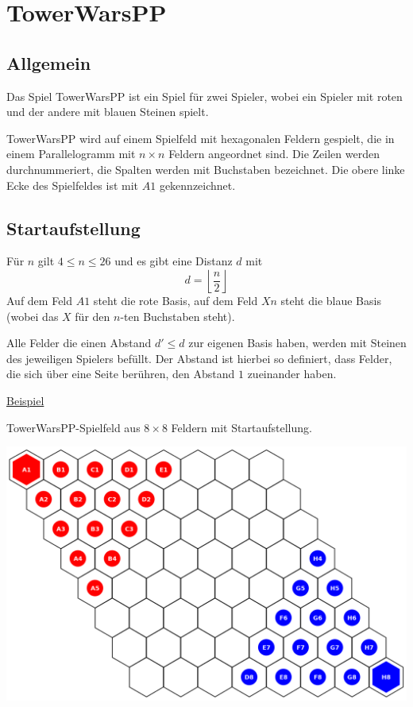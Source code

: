 \section*{TowerWarsPP}
\newcommand{\myAlph}[1]{\char\numexpr`A-1+#1\relax}
\newcommand{\myalph}[1]{\char\numexpr`a-1+#1\relax}

\subsection*{Allgemein}
Das Spiel TowerWarsPP ist ein Spiel für zwei Spieler, wobei ein Spieler mit roten und der andere mit blauen Steinen spielt.

TowerWarsPP wird auf einem Spielfeld mit hexagonalen Feldern gespielt, die in einem Parallelogramm mit $n \times n$ Feldern angeordnet sind. Die Zeilen werden durchnummeriert, die Spalten werden mit Buchstaben bezeichnet. Die obere linke Ecke des Spielfeldes ist mit $A1$ gekennzeichnet.

\subsection*{Startaufstellung}
Für $n$ gilt $4 \le n \le 26$ und es gibt eine Distanz $d$ mit \[d = \left\lfloor \frac{n}{2}\right\rfloor\] Auf dem Feld $A1$ steht die rote Basis, auf dem Feld $Xn$ steht die blaue Basis (wobei das $X$ für den $n$-ten Buchstaben steht). 

Alle Felder die einen Abstand $d' \le d$ zur eigenen Basis haben, werden mit Steinen des jeweiligen Spielers befüllt. Der Abstand ist hierbei so definiert, dass Felder, die sich über eine Seite berühren, den Abstand $1$ zueinander haben.

\underline{Beispiel}

TowerWarsPP-Spielfeld aus $8 \times 8$ Feldern mit Startaufstellung.
\begin{center}
\includegraphics[scale=0.3]{graphic/start8.png}
\end{center}


